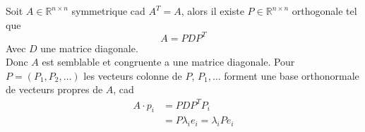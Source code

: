 \documentclass[../main.tex]{subfiles}
\begin{document}
\begin{thm}
	Soit $A \in \mathbb{R}^{n\times n}$ symmetrique cad $A^{T}=A$, alors il existe $P \in \mathbb{R}^{n\times n}$ orthogonale tel que
	\[ 
	A = P D P^{T}
	\]
	Avec $D$ une matrice diagonale.\\
	Donc $A$ est semblable et congruente a une matrice diagonale.
	Pour $P=(P_1,P_2, \ldots ) $ les vecteurs colonne de $P$, $P_1, \ldots$ forment une base orthonormale de vecteurs propres de $A$, cad
	\begin{align*}
		A \cdot p_i &= P D P^{T}P_i \\
			    &=P \lambda_i e_i = \lambda_i P e_i
	\end{align*}
	
\end{thm}
\end{document}
